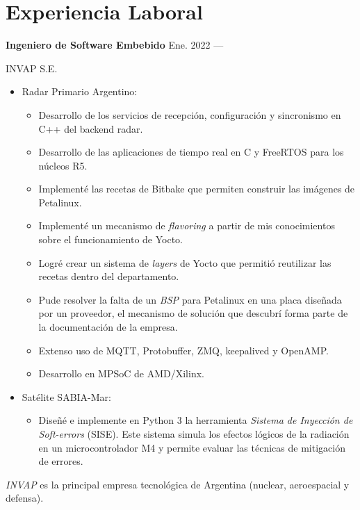 \section{Experiencia Laboral}


\parbox[t][][t]{\linewidth}{
	\parbox{\linewidth}{
		\textbf{Ingeniero de Software Embebido}
			\hfill
			{Ene. 2022 --- \phantom{Dic. 2099}}
		}
	\smallbreak
	\parbox{\linewidth}{INVAP S.E.}
	\smallbreak
	\begin{itemize}
		\item Radar Primario Argentino:
		\begin{itemize}
			\item{Desarrollo de los servicios de recepción, configuración y sincronismo en C++ del backend radar.}
			\item{Desarrollo de las aplicaciones de tiempo real en C y FreeRTOS para los núcleos R5.}
			\item{Implementé las recetas de Bitbake que permiten construir las imágenes de Petalinux.}
			\item{Implementé un mecanismo de \emph{flavoring} a partir de mis conocimientos sobre el funcionamiento de Yocto.}
			\item{Logré crear un sistema de \emph{layers} de Yocto que permitió reutilizar las recetas dentro del departamento.}
			\item{Pude resolver la falta de un \emph{BSP} para Petalinux en una placa diseñada por un proveedor, el mecanismo de solución que descubrí forma parte de la documentación de la empresa.}
			\item{Extenso uso de MQTT, Protobuffer, ZMQ, keepalived y OpenAMP.}
	    	\item{Desarrollo en MPSoC de AMD/Xilinx.}
		\end{itemize}
		\item Satélite SABIA-Mar:
		\begin{itemize}
	    	\item{Diseñé e implemente en Python 3 la herramienta \emph{Sistema de Inyección de Soft-errors} (SISE). Este sistema simula los efectos lógicos de la radiación en un microcontrolador M4 y permite evaluar las técnicas de mitigación de errores.}
		\end{itemize}
	\end{itemize}
	\smallbreak
    \emph{INVAP} es la principal empresa tecnológica de Argentina (nuclear, aeroespacial y defensa).
}

